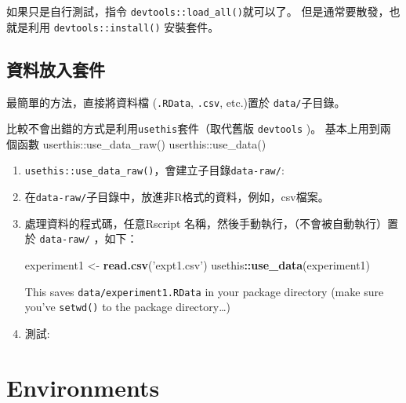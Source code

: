 \documentclass[]{book}
\newenvironment{Shaded}{\begin{snugshade}}{\end{snugshade}}
\newcommand{\CommentTok}[1]{\textcolor[rgb]{0.56,0.35,0.01}{\textit{#1}}}
\newcommand{\KeywordTok}[1]{\textcolor[rgb]{0.13,0.29,0.53}{\textbf{#1}}}
\newcommand{\NormalTok}[1]{#1}
\newcommand{\OperatorTok}[1]{\textcolor[rgb]{0.81,0.36,0.00}{\textbf{#1}}}
\newcommand{\StringTok}[1]{\textcolor[rgb]{0.31,0.60,0.02}{#1}}
\theoremstyle{definition}
\theoremstyle{definition}
\theoremstyle{definition}
\theoremstyle{remark}
\begin{document}
如果只是自行測試，指令 \texttt{devtools::load\_all()}就可以了。
但是通常要散發，也就是利用 \texttt{devtools::install()} 安裝套件。

\section{資料放入套件}

最簡單的方法，直接將資料檔 (\texttt{.RData}, \texttt{.csv}, etc.)置於
\texttt{data/}子目錄。

比較不會出錯的方式是利用\texttt{usethis}套件（取代舊版 \texttt{devtools}
)。 基本上用到兩個函數 userthis::use\_data\_raw() userthis::use\_data()

\begin{enumerate}
\def\labelenumi{\arabic{enumi}.}
\item
  \texttt{usethis::use\_data\_raw()}，會建立子目錄\texttt{data-raw/}:
\item
  在\texttt{data-raw/}子目錄中，放進非R格式的資料，例如，csv檔案。
\item
  處理資料的程式碼，任意Rscript
  名稱，然後手動執行，（不會被自動執行）置於 \texttt{data-raw/} ，如下：

\begin{Shaded}
\begin{Highlighting}[]
\NormalTok{experiment1 <-}
\StringTok{  }\KeywordTok{read.csv}\NormalTok{(}\StringTok{'expt1.csv'}\NormalTok{) }
\NormalTok{usethis}\OperatorTok{::}\KeywordTok{use_data}\NormalTok{(experiment1)}
\end{Highlighting}
\end{Shaded}

  This saves \texttt{data/experiment1.RData} in your package directory
  (make sure you've \texttt{setwd()} to the package directory\ldots{})
\item
  測試:

\begin{Shaded}
\end{Shaded}
\end{enumerate}

\hypertarget{environments}{%
\chapter{Environments}\label{environments}}
\end{document}
